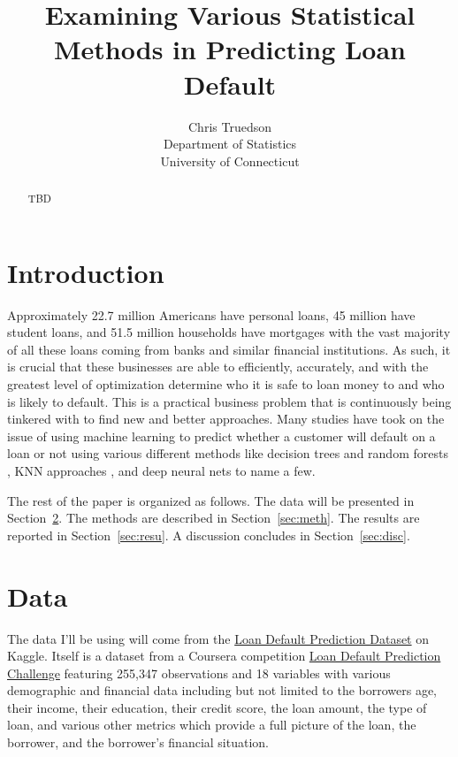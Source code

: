 \documentclass[12pt]{article}
\title{Examining Various Statistical Methods in Predicting Loan Default}
\author{Chris Truedson\\
  Department of Statistics\\
  University of Connecticut
}
\begin{document}
\maketitle

\begin{abstract}
TBD  
\end{abstract}


\section{Introduction}
\label{sec:intro}

Approximately 22.7 million Americans have personal loans, 45 million have student loans, and 51.5 million households have mortgages with the vast majority of all these loans coming from banks and similar financial institutions. As such, it is crucial that these businesses are able to efficiently, accurately, and with the greatest level of optimization determine who it is safe to loan money to and who is likely to default. This is a practical business problem that is continuously being tinkered with to find new and better approaches. Many studies have took on the issue of using machine learning to predict whether a customer will default on a loan or not using various different methods like decision trees and random forests \citet{madaan2021loan}, KNN approaches \citet{lai2020loan}, and deep neural nets \citet{bayraci2019deep} to name a few.

The rest of the paper is organized as follows.
The data will be presented in Section~\ref{sec:data}.
The methods are described in Section~\ref{sec:meth}.
The results are reported in Section~\ref{sec:resu}.
A discussion concludes in Section~\ref{sec:disc}.


\section{Data}
\label{sec:data}

The data I'll be using will come from the \href{https://www.kaggle.com/datasets/nikhil1e9/loan-default}{Loan Default Prediction Dataset} on Kaggle. Itself is a dataset from a Coursera competition \href{https://www.coursera.org/projects/data-science-coding-challenge-loan-default-prediction}{Loan Default Prediction Challenge} featuring 255,347 observations and 18 variables with various demographic and financial data including but not limited to the borrowers age, their income, their education, their credit score, the loan amount, the type of loan, and various other metrics which provide a full picture of the loan, the borrower, and the borrower's financial situation.
\end{document}
